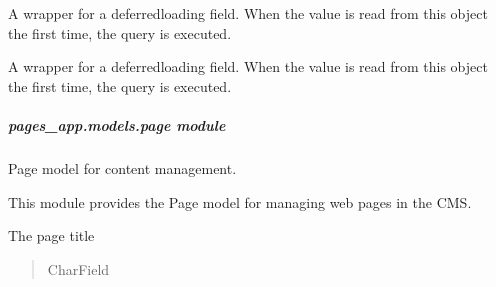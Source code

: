 \documentclass[letterpaper,10pt,english]{sphinxmanual}
\begin{document}
\begin{fulllineitems}
\begin{fulllineitems}
\label{\detokenize{pages_app.models:id11}}
\pysigstartsignatures
\pysigline
{}
\pysigstopsignatures
\sphinxAtStartPar
A wrapper for a deferred\sphinxhyphen{}loading field. When the value is read from this
object the first time, the query is executed.

\end{fulllineitems}


\begin{fulllineitems}
\label{\detokenize{pages_app.models:pages_app.models.menu_item.MenuItem.updated_at}}
\pysigstartsignatures
\pysigline
{}
\pysigstopsignatures
\sphinxAtStartPar
A wrapper for a deferred\sphinxhyphen{}loading field. When the value is read from this
object the first time, the query is executed.

\end{fulllineitems}


\end{fulllineitems}



\subparagraph{pages\_app.models.page module}
\label{\detokenize{pages_app.models:module-pages_app.models.page}}\label{\detokenize{pages_app.models:pages-app-models-page-module}}
\sphinxAtStartPar
Page model for content management.

\sphinxAtStartPar
This module provides the Page model for managing web pages in the CMS.

\begin{fulllineitems}
\label{\detokenize{pages_app.models:pages_app.models.page.title}}
\pysigstartsignatures
\pysigline
{}
\pysigstopsignatures
\sphinxAtStartPar
The page title
\begin{quote}\begin{description}
\sphinxAtStartPar
CharField

\end{description}\end{quote}

\end{fulllineitems}
\end{document}
